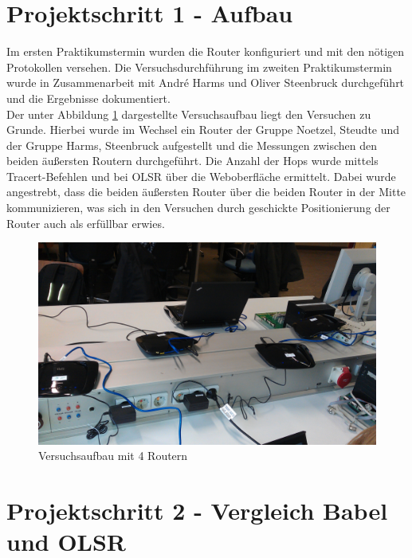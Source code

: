 \documentclass[10pt]{scrartcl}
\author{Carsten Noetzel, Armin Steudte}
\title{\titletext}
\date{09.11.2011}
\begin{document}
\maketitle

\setcounter{tocdepth}{3}
\tableofcontents
\listoffigures

\section{Projektschritt 1 - Aufbau}
Im ersten Praktikumstermin wurden die Router konfiguriert und mit den nötigen Protokollen versehen. Die Versuchsdurchführung im zweiten Praktikumstermin wurde in Zusammenarbeit mit André Harms und Oliver Steenbruck durchgeführt und die Ergebnisse dokumentiert.\\
Der unter Abbildung \ref{fig:Aufbau} dargestellte Versuchsaufbau liegt den Versuchen zu Grunde. Hierbei wurde im Wechsel ein Router der Gruppe Noetzel, Steudte und der Gruppe Harms, Steenbruck aufgestellt und die Messungen zwischen den beiden äußersten Routern durchgeführt. Die Anzahl der Hops wurde mittels Tracert-Befehlen und bei OLSR über die Weboberfläche ermittelt. Dabei wurde angestrebt, dass die beiden äußersten Router über die beiden Router in  der Mitte kommunizieren, was sich in den Versuchen durch geschickte Positionierung der Router auch als erfüllbar erwies.

\begin{figure}[htbp]
	\centering	\includegraphics[width=1.0\textwidth]{Grafiken/AufbauBild.jpg}
	\caption{Versuchsaufbau mit 4 Routern}
	\label{fig:Aufbau}
\end{figure} 

\section{Projektschritt 2 - Vergleich Babel und OLSR}
\end{document}
